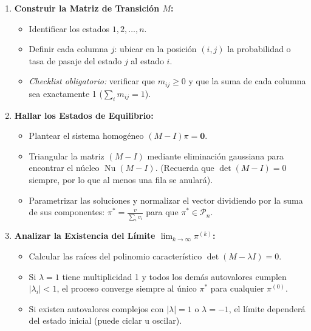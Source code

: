 \documentclass[11pt,a4paper]{article}
\theoremstyle{definition}
\begin{document}
\begin{enumerate}[label=\textbf{Paso \arabic*:}]
    \item \textbf{Construir la Matriz de Transición $M$:}
          \begin{itemize}
              \item Identificar los estados $1, 2, \dots, n$.
              \item Definir cada columna $j$: ubicar en la posición $(i, j)$ la probabilidad o tasa
                    de pasaje del estado $j$ al estado $i$.
              \item \emph{Checklist obligatorio:} verificar que $m_{ij} \ge 0$ y que la suma de cada columna sea exactamente 1 ($\sum_i m_{ij} = 1$).
          \end{itemize}

    \item \textbf{Hallar los Estados de Equilibrio:}
          \begin{itemize}
              \item Plantear el sistema homogéneo $(M - I)\pi = \mathbf{0}$.
              \item Triangular la matriz $(M - I)$ mediante eliminación gaussiana para encontrar el
                    núcleo $\operatorname{Nu}(M - I)$. (Recuerda que $\det(M - I) = 0$ siempre, por
                    lo que al menos una fila se anulará).
              \item Parametrizar las soluciones y normalizar el vector dividiendo por la suma de
                    sus componentes: $\pi^* = \frac{v}{\sum_i v_i}$ para que $\pi^* \in
                        \mathcal{P}_n$.
          \end{itemize}

    \item \textbf{Analizar la Existencia del Límite $\lim_{k \to \infty} \pi^{(k)}$:}
          \begin{itemize}
              \item Calcular las raíces del polinomio característico $\det(M - \lambda I) = 0$.
              \item Si $\lambda = 1$ tiene multiplicidad 1 y todos los demás autovalores cumplen
                    $|\lambda_i| < 1$, el proceso converge siempre al único $\pi^*$ para cualquier
                    $\pi^{(0)}$.
              \item Si existen autovalores complejos con $|\lambda| = 1$ o $\lambda = -1$, el
                    límite dependerá del estado inicial (puede ciclar u oscilar).
          \end{itemize}


\end{enumerate}
\end{document}
